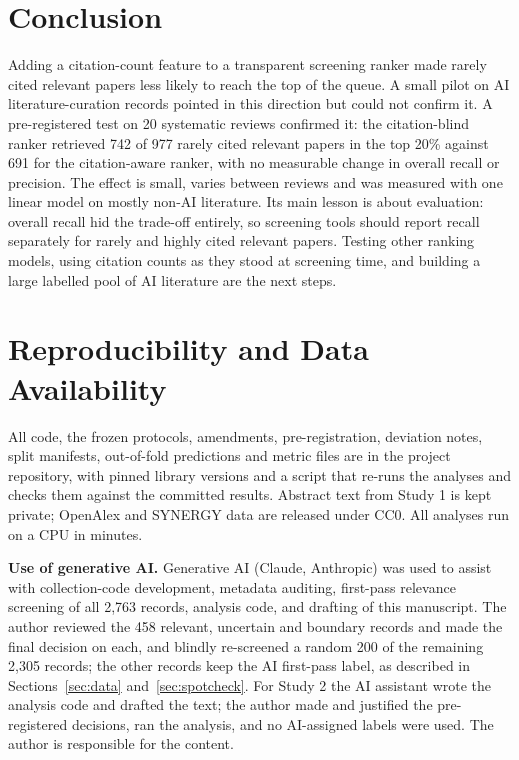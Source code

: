 \documentclass[acmsmall,screen,nonacm]{acmart}
\begin{document}
\section{Conclusion}
\label{sec:conclusion}

Adding a citation-count feature to a transparent screening ranker made rarely cited relevant papers less
likely to reach the top of the queue. A small pilot on AI literature-curation records pointed in this
direction but could not confirm it. A pre-registered test on 20 systematic reviews confirmed it: the
citation-blind ranker retrieved 742 of 977 rarely cited relevant papers in the top 20\% against 691 for the
citation-aware ranker, with no measurable change in overall recall or precision. The effect is small,
varies between reviews and was measured with one linear model on mostly non-AI literature. Its main
lesson is about evaluation: overall recall hid the trade-off entirely, so screening tools should report
recall separately for rarely and highly cited relevant papers. Testing other ranking models, using
citation counts as they stood at screening time, and building a large labelled pool of AI literature are
the next steps.

\section{Reproducibility and Data Availability}

All code, the frozen protocols, amendments, pre-registration, deviation notes, split manifests, out-of-fold
predictions and metric files are in the project repository, with pinned library versions and a script that
re-runs the analyses and checks them against the committed results. Abstract text from Study 1 is kept
private; OpenAlex and SYNERGY data are released under CC0. All analyses run on a CPU in minutes.

\begin{acks}
\textbf{Use of generative AI.} Generative AI (Claude, Anthropic) was used to assist with collection-code
development, metadata auditing, first-pass relevance screening of all 2,763 records, analysis code, and
drafting of this manuscript. The author reviewed the 458 relevant, uncertain and boundary records and made
the final decision on each, and blindly re-screened a random 200 of the remaining 2,305 records; the
other records keep the AI first-pass label, as described in Sections~\ref{sec:data} and~\ref{sec:spotcheck}. For
Study 2 the AI assistant wrote the analysis code and drafted the text; the author made and justified the
pre-registered decisions, ran the analysis, and no AI-assigned labels were used. The author is responsible
for the content.
\end{acks}



\end{document}
